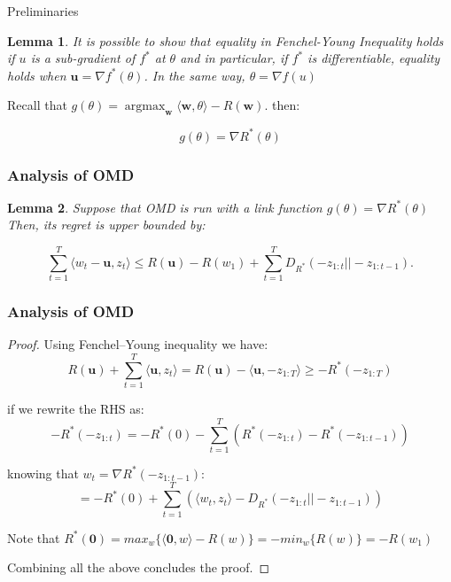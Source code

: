 \documentclass{beamer}
\DeclareMathOperator*{\argmax}{argmax}
\newtheorem{lem}{Lemma}
\newcommand{\uu}{\mathbf{u}}
\newcommand{\w}{\mathbf{w}}
\begin{document}
\begin{frame}{Preliminaries}
\begin{lem}
It is possible to show that equality in Fenchel-Young Inequality holds if $u$ is a sub-gradient of
$f^*$ at $\theta$ and in particular, if $f^*$ is differentiable, equality holds when $\uu= \nabla f^* (\theta)$. In the same way, $\theta = \nabla f(u)$
\end{lem}


\pause


Recall that $g(\theta)  = \argmax_\w \langle \w, \theta \rangle - R(\w)$. then:

\begin{equation}
g(\theta)= \nabla R^*(\theta)
\end{equation}


\end{frame}


\begin{frame}
\frametitle{Analysis of OMD}

\begin{lem}
Suppose that OMD is run with a link function $g(\theta)= \nabla R^*(\theta)$
Then, its regret is upper bounded by:

\begin{equation}
\sum_{t=1}^T  \langle w_t-\uu , z_t \rangle \leq  R(\uu)-R(w_1)+  \sum_{t=1}^T D_{R^*}(-z_{1:t}|| -z_{1:t-1}).
\end{equation}
\end{lem}


\end{frame}



\begin{frame}
\frametitle{Analysis of OMD}



\begin{proof}
Using Fenchel–Young inequality we have:
{\scriptsize
$$R(\uu)+ \sum_{t=1}^T  \langle \uu , z_t \rangle=  R(\uu)- \langle \uu , -z_{1:T} \rangle \geq -R^*(-z_{1:T})$$
}

\pause

\vspace{-0.2cm}
if we rewrite the RHS as: 
{\scriptsize
$$-R^*(-z_{1:t})= -R^*(0)- \sum_{t=1}^T (R^*(-z_{1:t}) -R^*(-z_{1:t-1}))$$
}
\vspace{-0.2cm}

\pause

knowing that $w_t=  \nabla R^*(-z_{1:t-1})$:
{\scriptsize
$$=  -R^*(0)+ \sum_{t=1}^T (\langle  w_t, z_t \rangle - D_{R^*}(-z_{1:t} ||-z_{1:t-1}))$$
}
\vspace{-0.2cm}

Note that $R^*(\mathbf{0})= max_w \{\langle \mathbf{0}, w \rangle- R(w)\}= - min_w\{R(w)\}= -R(w_1)$

Combining all the above concludes the proof.

\end{proof}

\end{frame}
\end{document}
